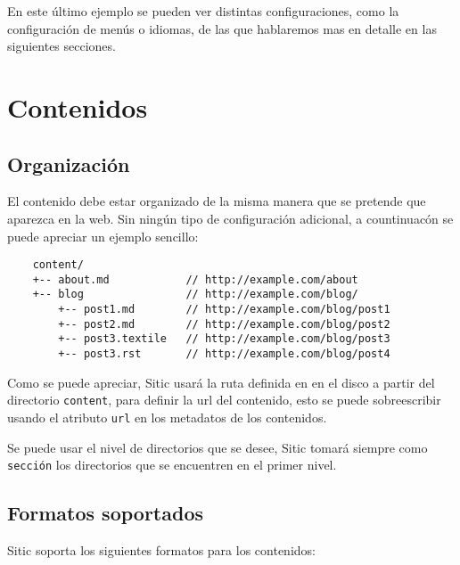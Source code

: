 En este último ejemplo se pueden ver distintas configuraciones, como la configuración de menús o
idiomas, de las que hablaremos mas en detalle en las siguientes secciones.



\section{Contenidos}

\subsection{Organización}

El contenido debe estar organizado de la misma manera que se pretende que aparezca en la web.
Sin ningún tipo de configuración adicional, a countinuacón se puede apreciar un ejemplo sencillo:

\begin{verbatim}
    content/
    +-- about.md            // http://example.com/about
    +-- blog                // http://example.com/blog/
        +-- post1.md        // http://example.com/blog/post1
        +-- post2.md        // http://example.com/blog/post2
        +-- post3.textile   // http://example.com/blog/post3
        +-- post3.rst       // http://example.com/blog/post4
\end{verbatim}

Como se puede apreciar, Sitic usará la ruta definida en en el disco a partir del directorio \texttt{content},
para definir la url del contenido, esto se puede sobreescribir usando el atributo \texttt{url} en los metadatos
de los contenidos.

Se puede usar el nivel de directorios que se desee, Sitic tomará siempre como \texttt{sección} los
directorios que se encuentren en el primer nivel.

\subsection{Formatos soportados}

Sitic soporta los siguientes formatos para los contenidos:

